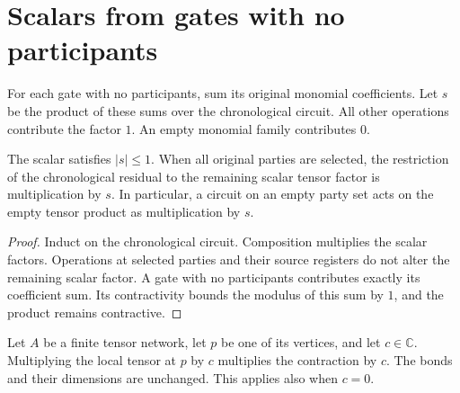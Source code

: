\section{Scalars from gates with no participants}
\label{sec:peps_empty_gate_scalars}

\begin{definition}
    \label{def:peps_empty_gate_scalar}
    \leanok
    For each gate with no participants, sum its original monomial
    coefficients. Let $s$ be the product of these sums over the
    chronological circuit. All other operations contribute the factor $1$.
    An empty monomial family contributes $0$.
\end{definition}

\begin{theorem}
    \label{thm:peps_empty_gate_scalar_residual}
    \leanok
    The scalar satisfies $|s|\leq 1$. When all original parties are
    selected, the restriction of the chronological residual to the
    remaining scalar tensor factor is multiplication by $s$.
    In particular, a circuit on an empty party set acts on the empty
    tensor product as multiplication by $s$.
\end{theorem}

\begin{proof}\leanok
    Induct on the chronological circuit. Composition multiplies the
    scalar factors. Operations at selected parties and their source
    registers do not alter the remaining scalar factor. A gate with
    no participants contributes exactly its coefficient sum. Its
    contractivity bounds the modulus of this sum by $1$, and the
    product remains contractive.
\end{proof}

\begin{theorem}
    \label{thm:peps_network_scalar_absorption}
    \leanok
    Let $A$ be a finite tensor network, let $p$ be one of its vertices,
    and let $c\in\mathbb C$. Multiplying the local tensor at $p$ by
    $c$ multiplies the contraction by $c$. The bonds and their dimensions
    are unchanged. This applies also when $c=0$.
\end{theorem}

